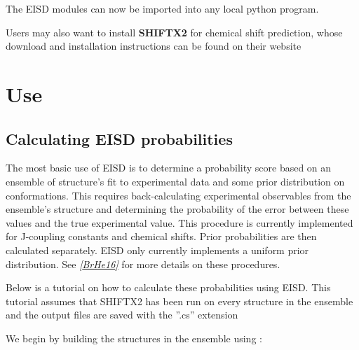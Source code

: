 \documentclass[letterpaper,10pt,english]{sphinxmanual}
\begin{document}
The EISD modules can now be imported into any local python program.

Users may also want to install \textbf{SHIFTX2} for chemical shift prediction, whose download and installation
instructions can be found on their website


\section{Use}
\label{use:use}\label{use::doc}\label{use:their-website}

\subsection{Calculating EISD probabilities}
\label{use:calculating-eisd-probabilities}
The most basic use of EISD is to determine a probability score based on
an ensemble of structure's fit to experimental data and some prior distribution on
conformations. This requires back-calculating experimental observables from the ensemble's structure
and determining the probability of the error between these values and the
true experimental value. This procedure is currently implemented for J-coupling
constants and chemical shifts. Prior probabilities are then calculated separately. EISD
only currently implements a uniform prior distribution. See \label{use:id1}{\hyperref[references:brhe16]{\emph{{[}BrHe16{]}}}} for more
details on these procedures.

Below is a tutorial on how to calculate these probabilities using EISD.
This tutorial assumes that SHIFTX2 has been run on every structure in the ensemble
and the output files are saved with the ''.cs'' extension

We begin by building the structures in the ensemble using {\hyperref[modules:structure.Structure]{\emph{}}}:
\end{document}

